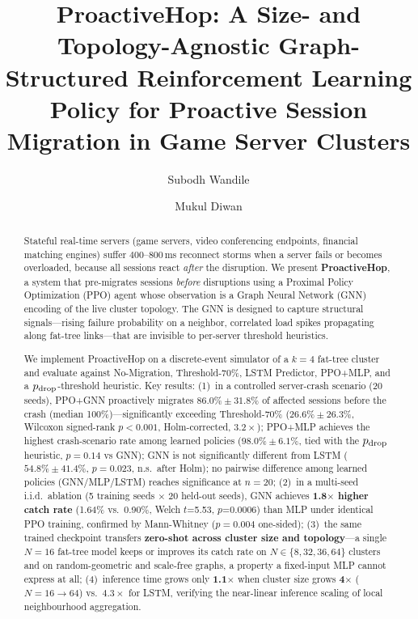 \documentclass[review,1p]{elsarticle}
\theoremstyle{definition}
\begin{document}
\begin{frontmatter}

\title{ProactiveHop: A Size- and Topology-Agnostic Graph-Structured
Reinforcement Learning Policy for Proactive Session Migration in
Game Server Clusters}

\author[1]{Subodh Wandile}
\author[1]{Mukul Diwan}
\address[1]{Independent Researcher, Bengaluru, India}

\begin{abstract}
Stateful real-time servers (game servers, video conferencing endpoints,
financial matching engines) suffer $400$--$800$\,ms reconnect storms when
a server fails or becomes overloaded, because all sessions react
\emph{after} the disruption. We present \textbf{ProactiveHop}, a
system that pre-migrates sessions \emph{before} disruptions using a
Proximal Policy Optimization (PPO) agent whose observation is a
Graph Neural Network (GNN) encoding of the live cluster topology.
The GNN is designed to capture structural signals---rising failure probability on
a neighbor, correlated load spikes propagating along fat-tree
links---that are invisible to per-server threshold heuristics.

We implement ProactiveHop on a discrete-event simulator of a
$k{=}4$ fat-tree cluster and evaluate against No-Migration,
Threshold-70\%, LSTM Predictor, PPO+MLP, and a $p_{\rm drop}$-threshold heuristic.  Key results:
(1)~in a controlled server-crash scenario (20 seeds), PPO+GNN proactively migrates
$86.0\%\!\pm\!31.8\%$ of affected sessions before the crash (median 100\%)---significantly
exceeding Threshold-70\% ($26.6\%\!\pm\!26.3\%$, Wilcoxon signed-rank $p{<}0.001$, Holm-corrected, $3.2\times$);
PPO+MLP achieves the highest crash-scenario rate among learned policies ($98.0\%\!\pm\!6.1\%$, tied with the $p_{\rm drop}$ heuristic, $p{=}0.14$ vs GNN);
GNN is not significantly different from LSTM ($54.8\%\!\pm\!41.4\%$, $p{=}0.023$, n.s.\ after Holm);
no pairwise difference among learned policies (GNN/MLP/LSTM) reaches significance at $n{=}20$;
(2)~in a multi-seed i.i.d.\ ablation (5 training seeds $\times$ 20 held-out seeds), GNN achieves
\textbf{1.8$\times$ higher catch rate} (1.64\% vs.\ 0.90\%, Welch $t$=5.53, $p$=0.0006) than MLP
under identical PPO training, confirmed by Mann-Whitney ($p{=}0.004$ one-sided);
(3)~the same trained checkpoint transfers \textbf{zero-shot across cluster size and
topology}---a single $N{=}16$ fat-tree model keeps or improves its catch rate on
$N{\in}\{8,32,36,64\}$ clusters and on random-geometric and scale-free graphs,
a property a fixed-input MLP cannot express at all;
(4)~inference time grows only \textbf{1.1$\times$} when cluster size
grows \textbf{4$\times$} ($N{=}16\!\to\!64$) vs.\ $4.3\times$ for LSTM,
verifying the near-linear inference scaling of local neighbourhood aggregation.


\end{abstract}
\end{frontmatter}
\end{document}
